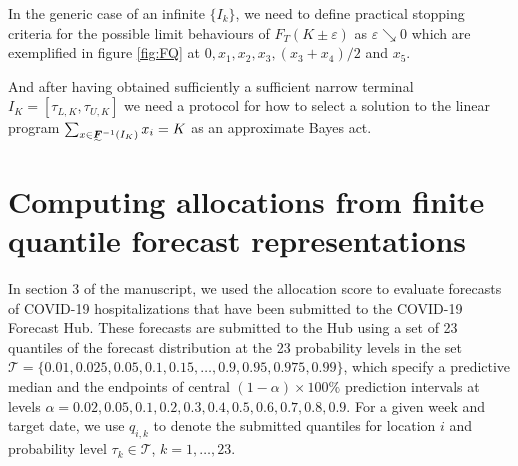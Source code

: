 \documentclass{article}
\begin{document}
In the generic case of an infinite $\{I_k\}$, we need to define practical stopping criteria for the possible limit behaviours of 
$F_T(K \pm \varepsilon)$ as $\varepsilon \searrow 0$ which are exemplified in figure \ref{fig:FQ} at $0, x_1, x_2, x_3, (x_3 +x_4)/2$ and 
$x_5$.

And after having obtained sufficiently a sufficient narrow terminal $I_K = [\tau_{L,K}, \tau_{U,K}]$ we need a protocol for 
how to select a solution to the linear program $\sum_{x \in \undertilde{\bm{F}}^{-1}(I_K)}x_i = K$ as an approximate Bayes act.



\section{Computing allocations from finite quantile forecast representations}

In section 3 of the manuscript, we used the allocation score to evaluate forecasts of COVID-19 hospitalizations that have been submitted to the COVID-19 Forecast Hub. These forecasts are submitted to the Hub using a set of 23 quantiles of the forecast distribution at the 23 probability levels in the set $\mathcal{T} = \{0.01, 0.025, 0.05, 0.1, 0.15, \ldots, \allowbreak 0.9, 0.95, 0.975, 0.99\}$, which specify a predictive median and the endpoints of central $(1 - \alpha) \times 100\%$ prediction intervals at levels $\alpha = 0.02, 0.05, 0.1, 0.2, \allowbreak 0.3, 0.4, 0.5, 0.6, \allowbreak 0.7, 0.8, 0.9$. For a given week and target date, we use $q_{i,k}$ to denote the submitted quantiles for location $i$ and probability level $\tau_k \in \mathcal{T}$, $k = 1, \ldots, 23$.
\end{document}
